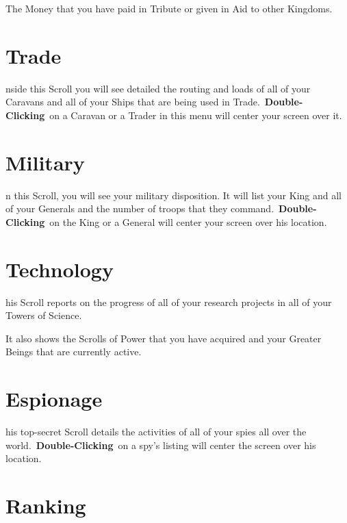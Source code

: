 The Money that you have paid in Tribute or given in Aid to other Kingdoms.

\section{Trade}


nside this Scroll you will see detailed the routing and loads of all of your Caravans and all of your Ships that are being used in Trade. \textbf{Double-Clicking} on a Caravan or a Trader in this menu will center your screen over it.

\section{Military}


n this Scroll, you will see your military disposition. It will list your King and all of your Generals and the number of troops that they command. \textbf{Double-Clicking} on the King or a General will center your screen over his location.

\section{Technology}

his Scroll reports on the progress of all of your research projects in all of your Towers of Science.

It also shows the Scrolls of Power that you have acquired and your Greater Beings that are currently active.

\section{Espionage}


his top-secret Scroll details the activities of all of your spies all over the world. \textbf{Double-Clicking} on a spy’s listing will center the screen over his location.

\section{Ranking}



